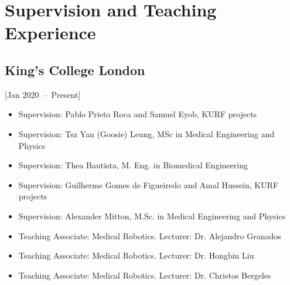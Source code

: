 \documentclass{mycv}
\begin{document}
\section{Supervision and Teaching Experience}
\subsection{King's College London}[Jan 2020~--~Present]
\begin{itemize}
	\item Supervision: Pablo Prieto Roca and Samuel Eyob, KURF projects  
	\item Supervision: Tsz Yan (Goosie) Leung, MSc in Medical Engineering and Physics  
	\item Supervision: Thea Bautista, M. Eng. in Biomedical Engineering  
	\item Supervision: Guilherme Gomes de Figueiredo and Amal Hussein, KURF projects  
	\item Supervision: Alexander Mitton, M.Sc. in Medical Engineering and Physics  
	\item Teaching Associate: Medical Robotics. Lecturer: Dr. Alejandro Granados 
	\item Teaching Associate: Medical Robotics. Lecturer: Dr. Hongbin Liu 
	\item Teaching Associate: Medical Robotics. Lecturer: Dr. Christos Bergeles 
\end{itemize}





\end{document}
